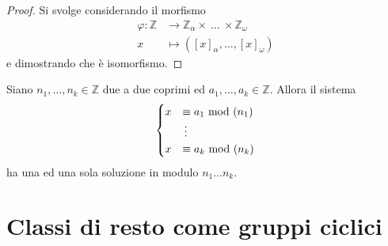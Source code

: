 \begin{proof}
	Si svolge considerando il morfismo
	\begin{align*}
	\varphi:\mathbb{Z}&\longrightarrow\mathbb{Z}_{\alpha}\times\ \dots \ \times\mathbb{Z}_{\omega}\\
	x&\longmapsto\left([x]_{\alpha},\dots,[x]_{\omega}\right)
	\end{align*}
	e dimostrando che è isomorfismo.
\end{proof}
\begin{teorema}
	Siano $n_1,\dots,n_k\in\mathbb{Z}$ due a due coprimi ed $a_1,\dots,a_k\in\mathbb{Z}$. Allora il sistema 
	\begin{equation*}
	\begin{cases}
	x&\equiv a_1\ \mathrm{mod}\ (n_1)\\
	&\,\vdots\\
	x&\equiv a_k\ \mathrm{mod}\ (n_k)
	\end{cases}
	\end{equation*}
	ha una ed una sola soluzione in modulo $n_1\dots n_k$.
\end{teorema}




\section{Classi di resto come gruppi ciclici}
